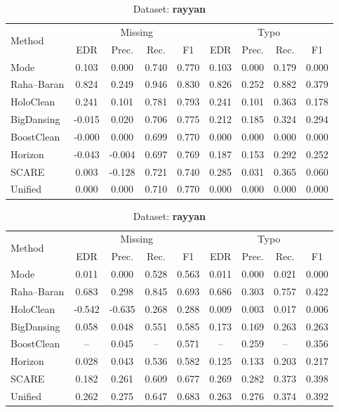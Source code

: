 \documentclass[10pt]{article} %
\numberwithin{equation}{section}
\begin{document}
\begin{table}[htbp]
\vspace{1.5em}

\begin{subtable}[t]{0.492\linewidth}
\caption{Dataset: \textbf{hospital}}
\label{tab:q1-acc-hospital}
\centering
\begin{tabular}{lcccccccc}
\toprule
\multirow{2}{*}{Method} &
\multicolumn{4}{c}{Missing} &
\multicolumn{4}{c}{Typo}\\
\cmidrule(lr){2-5}\cmidrule(l){6-9}
 & EDR & Prec. & Rec. & F1
 & EDR & Prec. & Rec. & F1\\
\midrule
Mode & 0.103 & 0.000 & 0.740 & 0.770 & 0.103 & 0.000 & 0.179 & 0.000 \\
Raha–Baran & 0.824 & 0.249 & 0.946 & 0.830 & 0.826 & 0.252 & 0.882 & 0.379 \\
HoloClean & 0.241 & 0.101 & 0.781 & 0.793 & 0.241 & 0.101 & 0.363 & 0.178 \\
BigDansing & -0.015 & 0.020 & 0.706 & 0.775 & 0.212 & 0.185 & 0.324 & 0.294 \\
BoostClean & -0.000 & 0.000 & 0.699 & 0.770 & 0.000 & 0.000 & 0.000 & 0.000 \\
Horizon & -0.043 & -0.004 & 0.697 & 0.769 & 0.187 & 0.153 & 0.292 & 0.252 \\
SCARE & 0.003 & -0.128 & 0.721 & 0.740 & 0.285 & 0.031 & 0.365 & 0.060 \\
Unified & 0.000 & 0.000 & 0.710 & 0.770 & 0.000 & 0.000 & 0.000 & 0.000 \\
\bottomrule
\end{tabular}
\end{subtable}\hspace{0.01\linewidth}
%
\begin{subtable}[t]{0.492\linewidth}
\caption{Dataset: \textbf{rayyan}}
\label{tab:q1-acc-rayyan}
\centering
\begin{tabular}{lcccccccc}
\toprule
\multirow{2}{*}{Method} &
\multicolumn{4}{c}{Missing} &
\multicolumn{4}{c}{Typo}\\
\cmidrule(lr){2-5}\cmidrule(l){6-9}
 & EDR & Prec. & Rec. & F1
 & EDR & Prec. & Rec. & F1\\
\midrule
Mode & 0.011 & 0.000 & 0.528 & 0.563 & 0.011 & 0.000 & 0.021 & 0.000 \\
Raha–Baran & 0.683 & 0.298 & 0.845 & 0.693 & 0.686 & 0.303 & 0.757 & 0.422 \\
HoloClean & -0.542 & -0.635 & 0.268 & 0.288 & 0.009 & 0.003 & 0.017 & 0.006 \\
BigDansing & 0.058 & 0.048 & 0.551 & 0.585 & 0.173 & 0.169 & 0.263 & 0.263 \\
BoostClean & -- & 0.045 & -- & 0.571 & -- & 0.259 & -- & 0.356 \\
Horizon & 0.028 & 0.043 & 0.536 & 0.582 & 0.125 & 0.133 & 0.203 & 0.217 \\
SCARE & 0.182 & 0.261 & 0.609 & 0.677 & 0.269 & 0.282 & 0.373 & 0.398 \\
Unified & 0.262 & 0.275 & 0.647 & 0.683 & 0.263 & 0.276 & 0.374 & 0.392 \\
\bottomrule
\end{tabular}
\end{subtable}


\end{table}
\end{document}
